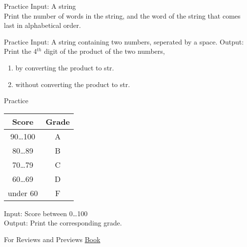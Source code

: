 \documentclass{beamer}
\begin{document}
\begin{frame}{Practice}
  Input: A string\\
  Print the number of words in the string, and the word of the string that comes last in
  alphabetical order.
\end{frame}

\begin{frame}{Practice}
  Input: A string containing two numbers, seperated by a space.
  Output: Print the 4$^{th}$ digit of the product of the two numbers,
  \begin{enumerate}
    \item by converting the product to str.
    \item without converting the product to str.
  \end{enumerate}
\end{frame}

\begin{frame}{Practice}
    \begin{tabular}{|*2c|}
      \hline
      Score & Grade \\\hline
      90\ldots100 & A \\
      80\ldots89 & B \\
      70\ldots79 & C \\
      60\ldots69 & D \\
      under 60 & F\\\hline
    \end{tabular}
    \bigskip

    Input: Score between 0\ldots100\\
    Output: Print the corresponding grade.
\end{frame}

\begin{frame}{For Reviews and Previews}
\href{https://github.com/swaroopch/byte-of-python}{Book}
\end{frame}
\end{document}
